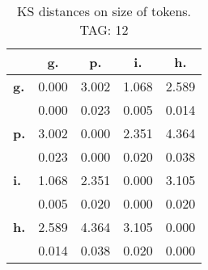 \begin{table}[h!]
\begin{center}
\begin{tabular}{| l || c | c | c | c |}\hline
 & {\bf g.} & {\bf p.} & {\bf i.} & {\bf h.} \\\hline\hline
{\bf g.} & 0.000 & 3.002 & 1.068 & 2.589 \\
{\bf } & 0.000 & 0.023 & 0.005 & 0.014 \\\hline
{\bf p.} & 3.002 & 0.000 & 2.351 & 4.364 \\
{\bf } & 0.023 & 0.000 & 0.020 & 0.038 \\\hline
{\bf i.} & 1.068 & 2.351 & 0.000 & 3.105 \\
{\bf } & 0.005 & 0.020 & 0.000 & 0.020 \\\hline
{\bf h.} & 2.589 & 4.364 & 3.105 & 0.000 \\
{\bf } & 0.014 & 0.038 & 0.020 & 0.000 \\\hline
\end{tabular}
\caption{KS distances on size of tokens. TAG: 12}
\end{center}
\end{table}